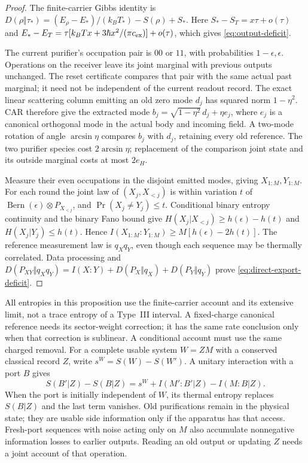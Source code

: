 \documentclass[12pt,a4paper]{article}
\begin{document}
\begin{proof}
The finite-carrier Gibbs identity is
$D(\rho\Vert\tau_*)=(E_\rho-E_*)/(k_BT_*)-S(\rho)+S_*$.
Here $S_*-S_T=x\tau+o(\tau)$ and
$E_*-E_T=\tau[k_BTx+3\hbar x^2/(\pi c_{\rm ex})]+o(\tau)$,
which gives \eqref{eq:output-deficit}.

The current purifier's occupation pair is $00$ or $11$, with
probabilities $1-\epsilon,\epsilon$. Operations on the receiver
leave its joint marginal with previous outputs unchanged. The reset
certificate compares that pair with the same actual past marginal;
it need not be independent of the current readout record.
The exact linear scattering column emitting an old zero mode $d_j$
has squared norm $1-\eta^2$. CAR therefore give the extracted mode
$b_j=\sqrt{1-\eta^2}\,d_j+\eta e_j$, where $e_j$ is a canonical
orthogonal mode in the actual body and incoming field. A two-mode
rotation of angle $\arcsin\eta$ compares $b_j$ with $d_j$, retaining
every old reference. The two purifier species cost $2\arcsin\eta$;
replacement of the comparison joint state and its outside marginal
costs at most $2e_H$.

Measure their even occupations in the disjoint emitted modes, giving
$X_{1:M},Y_{1:M}$. For each round the joint law of $(X_j,X_{<j})$
is within variation $t$ of
$\operatorname{Bern}(\epsilon)\otimes P_{X_{<j}}$, and
$\Pr(X_j\ne Y_j)\le t$. Conditional binary entropy continuity and
the binary Fano bound give
$H(X_j|X_{<j})\ge h(\epsilon)-h(t)$ and
$H(X_j|Y_j)\le h(t)$. Hence
$I(X_{1:M}:Y_{1:M})\ge M[h(\epsilon)-2h(t)]$.
The reference measurement law is $q_Xq_Y$, even though each sequence
may be thermally correlated. Data processing and
$D(P_{XY}\Vert q_Xq_Y)=I(X:Y)+D(P_X\Vert q_X)+D(P_Y\Vert q_Y)$
prove \eqref{eq:direct-export-deficit}.
\end{proof}

All entropies in this proposition use the finite-carrier account and
its extensive limit, not a trace entropy of a Type~III interval.
A fixed-charge canonical reference needs its sector-weight correction;
it has the same rate conclusion only when that correction is
sublinear. A conditional account must use the same charged removal.
For a complete usable system $W=ZM$ with a conserved classical record
$Z$, write $s^W=S(W)-S(W')$. A unitary interaction with a port $B$ gives
\[
 S(B'|Z)-S(B|Z)
 =s^W+I(M':B'|Z)-I(M:B|Z).
\]
When the port is initially independent of $W$, its thermal entropy
replaces $S(B|Z)$ and the last term vanishes. Old purifications remain
in the physical state; they are usable side information only if the
apparatus has that access. Fresh-port sequences with noise acting only
on $M$ also accumulate nonnegative information losses to earlier
outputs. Reading an old output or updating $Z$ needs a joint account
of that operation.
\end{document}
